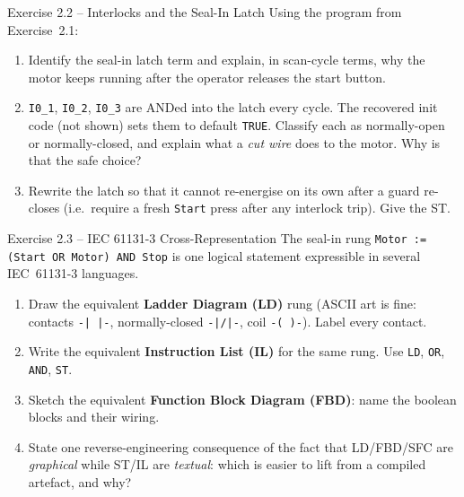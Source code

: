 \documentclass[11pt,a4paper]{article}
\begin{document}
\begin{taskbox}{Exercise 2.2 -- Interlocks and the Seal-In Latch}
Using the program from Exercise~2.1:
\begin{enumerate}\setlength{\itemsep}{0pt}
  \item Identify the seal-in latch term and explain, in scan-cycle terms, why the motor keeps
        running after the operator releases the start button.
  \item \texttt{I0\_1}, \texttt{I0\_2}, \texttt{I0\_3} are ANDed into the latch every cycle. The
        recovered init code (not shown) sets them to default \texttt{TRUE}. Classify each as
        normally-open or normally-closed, and explain what a \emph{cut wire} does to the motor.
        Why is that the safe choice?
  \item Rewrite the latch so that it cannot re-energise on its own after a guard re-closes
        (i.e.\ require a fresh \texttt{Start} press after any interlock trip). Give the ST.
\end{enumerate}
\end{taskbox}

\begin{taskbox}{Exercise 2.3 -- IEC 61131-3 Cross-Representation}
The seal-in rung \texttt{Motor := (Start OR Motor) AND Stop} is one logical statement expressible
in several IEC~61131-3 languages.
\begin{enumerate}\setlength{\itemsep}{0pt}
  \item Draw the equivalent \textbf{Ladder Diagram (LD)} rung (ASCII art is fine: contacts
        \texttt{-| |-}, normally-closed \texttt{-|/|-}, coil \texttt{-( )-}). Label every contact.
  \item Write the equivalent \textbf{Instruction List (IL)} for the same rung. Use \texttt{LD},
        \texttt{OR}, \texttt{AND}, \texttt{ST}.
  \item Sketch the equivalent \textbf{Function Block Diagram (FBD)}: name the boolean blocks and
        their wiring.
  \item State one reverse-engineering consequence of the fact that LD/FBD/SFC are \emph{graphical}
        while ST/IL are \emph{textual}: which is easier to lift from a compiled artefact, and why?
\end{enumerate}
\end{taskbox}
\end{document}

